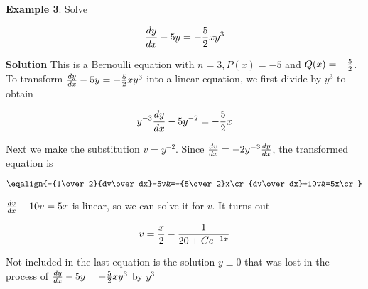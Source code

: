 \nopagenumbers
{\bf Example 3}: Solve

$${dy\over dx}-5y=-{5\over 2}xy^3$$

\vskip 6pt
{\bf Solution}
This is a Bernoulli equation with $n=3,P(x)=-5$ and $Q(x)=-{5\over 2}$. To transform ${dy\over dx}-5y=-{5\over 2}xy^3$ into a linear equation, we first divide by $y^3$ to obtain

$$y^{-3}{dy\over dx}-5y^{-2}=-{5\over 2}x$$

Next we make the substitution $v=y^{-2}$. Since ${dv\over dx}=-2y^{-3}{dy\over dx}$, the transformed equation is

$$\eqalign{-{1\over 2}{dv\over dx}-5v&=-{5\over 2}x\cr
		{dv\over dx}+10v&=5x\cr}$$

${dv\over dx}+10v=5x$ is linear, so we can solve it for $v$. It turns out

$$v={x\over 2}-{1\over 20 +Ce^{-1x}}$$

Not included in the last equation is the solution $y\equiv 0$ that was lost in the process of ${dy\over dx}-5y=-{5\over 2}xy^3$ by $y^3$
\vfill\eject
\bye
